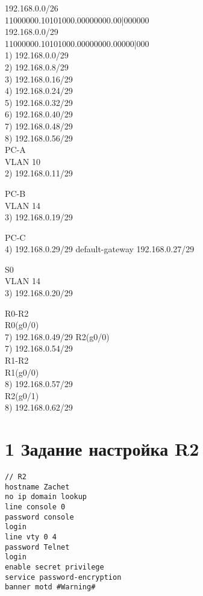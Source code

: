 192.168.0.0/26\\

11000000.10101000.00000000.00|000000\\

192.168.0.0/29\\

11000000.10101000.00000000.00000|000\\


1) 192.168.0.0/29 \\
2) 192.168.0.8/29\\
3) 192.168.0.16/29\\
4) 192.168.0.24/29\\
5) 192.168.0.32/29\\
6) 192.168.0.40/29\\
7) 192.168.0.48/29\\
8) 192.168.0.56/29\\


PC-A\\
VLAN 10\\
2) 192.168.0.11/29

PC-B\\
VLAN 14\\
3) 192.168.0.19/29

PC-C\\
4) 192.168.0.29/29 default-gateway 192.168.0.27/29

S0\\
VLAN 14\\
3) 192.168.0.20/29

R0-R2\\
R0(g0/0)\\
7) 192.168.0.49/29
R2(g0/0)\\
7) 192.168.0.54/29\\

R1-R2\\
R1(g0/0)\\
8) 192.168.0.57/29\\
R2(g0/1)\\
8) 192.168.0.62/29\\


\section{1 Задание настройка R2}

\begin{verbatim}
// R2
hostname Zachet
no ip domain lookup
line console 0
password console
login
line vty 0 4
password Telnet
login
enable secret privilege
service password-encryption
banner motd #Warning#
\end{verbatim}

